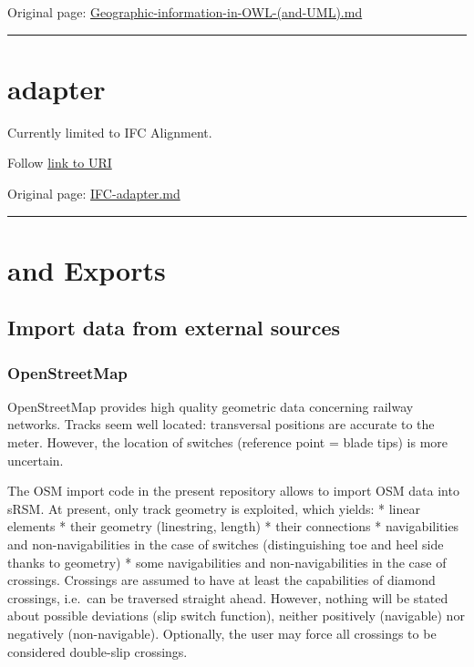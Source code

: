 \documentclass[
  11pt,
]{article}
\begin{document}
Original page:
\href{https://github.com/UICrail/CDM-RSM/wiki/Geographic-information-in-OWL-\%28and-UML\%29}{Geographic-information-in-OWL-(and-UML).md}

\begin{center}\rule{0.5\linewidth}{0.5pt}\end{center}

\hypertarget{adapter-1}{%
\section{adapter}\label{adapter-1}}

Currently limited to IFC Alignment.

Follow \href{https://cdm.ovh/rsm/adapters/ifcOwl_adapter}{link to URI}

Original page:
\href{https://github.com/UICrail/CDM-RSM/wiki/IFC-adapter}{IFC-adapter.md}

\begin{center}\rule{0.5\linewidth}{0.5pt}\end{center}

\hypertarget{and-exports}{%
\section{and Exports}\label{and-exports}}

\hypertarget{import-data-from-external-sources}{%
\subsection{Import data from external
sources}\label{import-data-from-external-sources}}

\hypertarget{openstreetmap}{%
\subsubsection{OpenStreetMap}\label{openstreetmap}}

OpenStreetMap provides high quality geometric data concerning railway
networks. Tracks seem well located: transversal positions are accurate
to the meter. However, the location of switches (reference point = blade
tips) is more uncertain.

The OSM import code in the present repository allows to import OSM data
into sRSM. At present, only track geometry is exploited, which yields: *
linear elements * their geometry (linestring, length) * their
connections * navigabilities and non-navigabilities in the case of
switches (distinguishing toe and heel side thanks to geometry) * some
navigabilities and non-navigabilities in the case of crossings.
Crossings are assumed to have at least the capabilities of diamond
crossings, i.e.~can be traversed straight ahead. However, nothing will
be stated about possible deviations (slip switch function), neither
positively (navigable) nor negatively (non-navigable). Optionally, the
user may force all crossings to be considered double-slip crossings.
\end{document}
